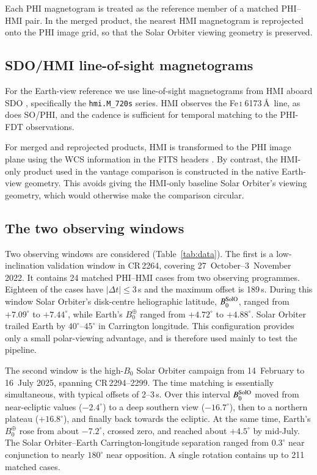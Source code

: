 \documentclass{aa}
\begin{document}
Each PHI magnetogram is treated as the reference member of a matched PHI--HMI pair. In the merged product, the nearest HMI magnetogram is reprojected onto the PHI image grid, so that the Solar Orbiter viewing geometry is preserved.

\subsection{SDO/HMI line-of-sight magnetograms}
\label{sec:data-hmi}

For the Earth-view reference we use line-of-sight magnetograms from HMI \citep{Scherrer2012} aboard SDO \citep{Pesnell2012}, specifically the \texttt{hmi.M\_720s} series. HMI observes the Fe\,\textsc{i} 6173\,\AA\ line, as does SO/PHI, and the cadence is sufficient for temporal matching to the PHI-FDT observations.

For merged and reprojected products, HMI is transformed to the PHI image plane using the WCS information in the FITS headers \citep{Thompson2006}. By contrast, the HMI-only product used in the vantage comparison is constructed in the native Earth-view geometry. This avoids giving the HMI-only baseline Solar Orbiter's viewing geometry, which would otherwise make the comparison circular.

\subsection{The two observing windows}
\label{sec:data-windows}

Two observing windows are considered (Table~\ref{tab:data}). The first is a low-inclination validation window in CR\,2264, covering 27~October--3~November 2022. It contains 24 matched PHI--HMI cases from two observing programmes. Eighteen of the cases have $|\Delta t|\le3$\,s and the maximum offset is 189\,s. During this window Solar Orbiter's disk-centre heliographic latitude, $B^{\rm SolO}_0$, ranged from $+7.09^{\circ}$ to $+7.44^{\circ}$, while Earth's $B^{\oplus}_0$ ranged from $+4.72^{\circ}$ to $+4.88^{\circ}$. Solar Orbiter trailed Earth by $40^{\circ}$--$45^{\circ}$ in Carrington longitude. This configuration provides only a small polar-viewing advantage, and is therefore used mainly to test the pipeline.

The second window is the high-$B_0$ Solar Orbiter campaign from 14~February to 16~July 2025, spanning CR\,2294--2299. The time matching is essentially simultaneous, with typical offsets of 2--3\,s. Over this interval $B^{\rm SolO}_0$ moved from near-ecliptic values ($-2.4^{\circ}$) to a deep southern view ($-16.7^{\circ}$), then to a northern plateau ($+16.8^{\circ}$), and finally back towards the ecliptic. At the same time, Earth's $B^{\oplus}_0$ rose from about $-7.2^{\circ}$, crossed zero, and reached about $+4.5^{\circ}$ by mid-July. The Solar Orbiter--Earth Carrington-longitude separation ranged from $0.3^{\circ}$ near conjunction to nearly $180^{\circ}$ near opposition. A single rotation contains up to 211 matched cases.
\end{document}
